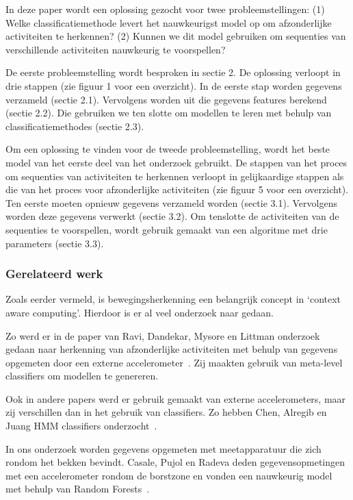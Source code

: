 \documentclass{article}
\begin{document}
In deze paper wordt een oplossing gezocht voor twee probleemstellingen: (1) Welke classificatiemethode levert het nauwkeurigst model op om afzonderlijke activiteiten te herkennen? (2) Kunnen we dit model gebruiken om sequenties van verschillende activiteiten nauwkeurig te voorspellen?

De eerste probleemstelling wordt besproken in sectie 2. De oplossing verloopt in drie stappen (zie figuur 1 voor een overzicht). In de eerste stap worden gegevens verzameld (sectie 2.1). Vervolgens worden uit die gegevens features berekend (sectie 2.2). Die gebruiken we ten slotte om modellen te leren met behulp van classificatiemethodes (sectie 2.3).

Om een oplossing te vinden voor de tweede probleemstelling, wordt het beste model van het eerste deel van het onderzoek gebruikt. De stappen van het proces om sequenties van activiteiten te herkennen verloopt in gelijkaardige stappen als die van het proces voor afzonderlijke activiteiten (zie figuur 5 voor een overzicht). Ten eerste moeten opnieuw gegevens verzameld worden (sectie 3.1). Vervolgens worden deze gegevens verwerkt (sectie 3.2). Om tenslotte de activiteiten van de sequenties te voorspellen, wordt gebruik gemaakt van een algoritme met drie parameters (sectie 3.3).

\subsubsection{Gerelateerd werk}

Zoals eerder vermeld, is bewegingsherkenning een belangrijk concept in `context aware computing'. Hierdoor is er al veel onderzoek naar gedaan.

Zo werd er in de paper van Ravi, Dandekar, Mysore en Littman onderzoek gedaan naar herkenning van afzonderlijke activiteiten met behulp van gegevens opgemeten door een externe accelerometer~\cite{Ravi and others:act.recogn.}.  Zij maakten gebruik van meta-level classifiers om modellen te genereren.

Ook in andere papers werd er gebruik gemaakt van externe accelerometers, maar zij verschillen dan in het gebruik van classifiers. Zo hebben Chen, Alregib en Juang HMM classifiers onderzocht~\cite{6dmotion}.

In ons onderzoek worden gegevens opgemeten met meetapparatuur die zich rondom het bekken bevindt. Casale, Pujol en Radeva deden gegevensopmetingen met een accelerometer rondom de borstzone en vonden een nauwkeurig model met behulp van Random Forests~\cite{act.rec.}.
\end{document}
